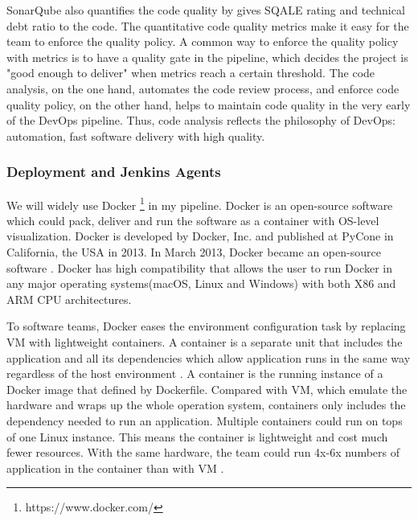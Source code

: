 SonarQube also quantifies the code quality by gives SQALE rating and technical debt ratio to the code. The quantitative code quality metrics make it easy for the team to enforce the quality policy. A common way to enforce the quality policy with metrics is to have a quality gate in the pipeline, which decides the project is "good enough to deliver" when metrics reach a certain threshold.
The code analysis, on the one hand, automates the code review process, and enforce code quality policy, on the other hand, helps to maintain code quality in the very early of the DevOps pipeline. Thus, code analysis reflects the philosophy of DevOps: automation, fast software delivery with high quality.
\subsubsection{Deployment and Jenkins Agents}
We will widely use Docker \footnote{https://www.docker.com/} in my pipeline.
Docker is an open-source software which could pack, deliver and run the software as a container with OS-level visualization. Docker is developed by Docker, Inc. and published at PyCone in California, the USA in 2013. In March 2013, Docker became an open-source software \cite{avram2013docker}. Docker has high compatibility that allows the user to run Docker in any major operating systems(macOS, Linux and Windows) with both X86 and ARM CPU architectures.
\par
To software teams, Docker eases the environment configuration task by replacing VM with lightweight containers.
A container is a separate unit that includes the application and all its dependencies which allow application runs in the same way regardless of the host environment \cite{WhatisaC60:online}. A container is the running instance of a Docker image that defined by Dockerfile. Compared with VM, which emulate the hardware and wraps up the whole operation system, containers only includes the dependency needed to run an application. Multiple containers could run on tops of one Linux instance. This means the container is lightweight and cost much fewer resources. With the same hardware, the team could run 4x-6x numbers of application in the container than with VM \cite{vaughan2014docker}.

